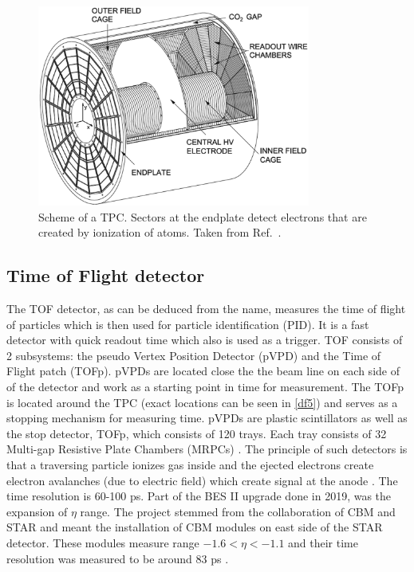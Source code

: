 \FloatBarrier
\begin{figure}
    \centering
    \includegraphics[width=0.8\textwidth]{figures/TPC.png}
    \caption[Schematic view of the Time Projection Chamber]{Scheme of a TPC. Sectors at the endplate detect electrons that are created by ionization of atoms. Taken from Ref.~\cite{sauli_2014}.}
    \label{df11}
\end{figure}
\FloatBarrier

\subsection{Time of Flight detector}
The TOF detector, as can be deduced from the name, measures the time of flight of particles which is then used for particle identification (PID). It is a fast detector with quick readout time which also is used as a trigger. TOF consists of 2 subsystems: the pseudo Vertex Position Detector (pVPD) and the Time of Flight patch (TOFp). pVPDs are located close the the beam line on each side of of the detector and work as a starting point in time for measurement. The TOFp is located around the TPC (exact locations can be seen in \autoref{df5}) and serves as a stopping mechanism for measuring time. pVPDs are plastic scintillators as well as the stop detector, TOFp, which consists of 120 trays. Each tray consists of 32 Multi-gap Resistive Plate Chambers (MRPCs) \cite{MRPC}. The principle of such detectors is that a traversing particle ionizes gas inside and the ejected electrons create electron avalanches (due to electric field) which create signal at the anode \cite{raphalthesis}. The time resolution is 60-100 ps. Part of the BES II upgrade done in 2019, was the expansion of $\eta$ range. The project stemmed from the collaboration of CBM and STAR and meant the installation of CBM modules on east side of the STAR detector. These modules measure range $-1.6<\eta <-1.1$ and their time resolution was measured to be around 83 ps \cite{BESII}. 


